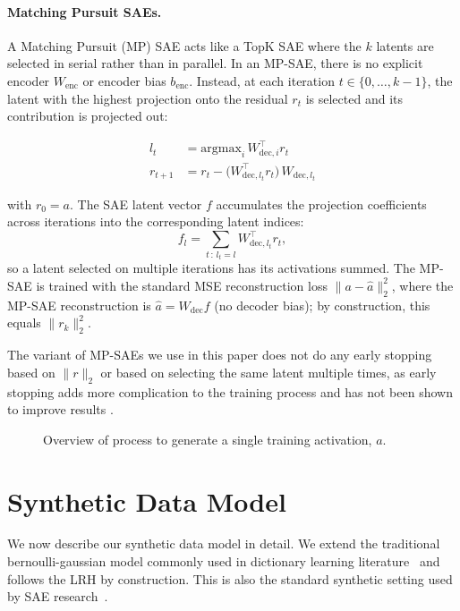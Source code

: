 \documentclass{article}
\theoremstyle{plain}
\theoremstyle{definition}
\theoremstyle{remark}
\newcommand{\enc}{\text{enc}}
\newcommand{\dec}{\text{dec}}
\newcommand{\argmax}{\text{argmax}}
\begin{document}
\paragraph{Matching Pursuit SAEs.} A Matching Pursuit (MP) SAE \citep{costa2025flat} acts like a TopK SAE where the $k$ latents are selected in serial rather than in parallel. In an MP-SAE, there is no explicit encoder $W_\enc$ or encoder bias $b_\enc$. Instead, at each iteration $t \in \{0, \dots, k-1\}$, the latent with the highest projection onto the residual $r_t$ is selected and its contribution is projected out:

\begin{align}
    l_t &= \argmax_i\, W_{\dec,i}^\top r_t \\
    r_{t+1} &= r_t - \bigl(W_{\dec,l_t}^\top r_t\bigr)\, W_{\dec,l_t}
\end{align}

with $r_0 = a$. The SAE latent vector $f$ accumulates the projection coefficients across iterations into the corresponding latent indices:
\begin{equation}
    f_l = \sum_{t\,:\,l_t = l} W_{\dec,l_t}^\top r_t,
\end{equation}
so a latent selected on multiple iterations has its activations summed. The MP-SAE is trained with the standard MSE reconstruction loss $\|a - \hat{a}\|_2^2$, where the MP-SAE reconstruction is $\hat{a} = W_\dec f$ (no decoder bias); by construction, this equals $\|r_k\|_2^2$.

The variant of MP-SAEs we use in this paper does not do any early stopping based on $\|r\|_2$ or based on selecting the same latent multiple times, as early stopping adds more complication to the training process and has not been shown to improve results \citep{chanin2025trainingmpsaes}.


\begin{figure}[t]
\centering
\resizebox{\textwidth}{!}{%

}
\caption{Overview of process to generate a single training activation, $a$.}
\label{fig:sampling}
\end{figure}


\section{Synthetic Data Model}

We now describe our synthetic data model in detail. We extend the traditional bernoulli-gaussian model commonly used in dictionary learning literature~\citep{Gribonval2010Dictionary,wang2020unique} and follows the LRH by construction. This is also the standard synthetic setting used by SAE research~\citep{song2025position,oneill2025compute,bussmann2025learning}. 
\end{document}
